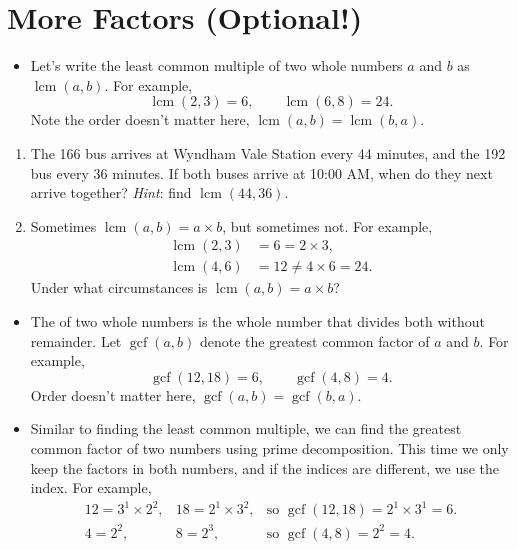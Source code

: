 \documentclass[12pt]{article}
\DeclareMathOperator{\lcm}{lcm}
\DeclareMathOperator{\gcf}{gcf}
\newcounter{exercisenum}
\newenvironment{exercises}{%
  \begin{tcolorbox}[colback=white,colframe=black,arc=0pt,breakable]
  \begin{enumerate}[label=\arabic*),leftmargin=1cm,resume=exercises]
  \setcounter{enumi}{\value{exercisenum}}
}{%
  \setcounter{exercisenum}{\value{enumi}}
  \end{enumerate}
  \end{tcolorbox}
}
\begin{document}
\thispagestyle{firstpage}

\section{More Factors (Optional!)}

\begin{itemize}
\item
Let's write the least common multiple of two whole numbers $a$ and $b$ as $\lcm(a,b)$. For example,
$$\lcm(2,3) = 6,\quad\quad \lcm(6, 8) = 24.$$
Note the order doesn't matter here, $\lcm(a,b) = \lcm(b,a)$.
\end{itemize}
\begin{exercises}
\item
The 166 bus arrives at Wyndham Vale Station every 44 minutes, and the 192 bus every 36 minutes. If both buses arrive at 10:00 AM, when do they next arrive together? \textit{Hint}: find $\lcm(44,36)$. \phantom{04:36 PM.}
\item 
Sometimes $\lcm(a,b)=a\times b$, but sometimes not. For example,
\begin{align*}
\lcm(2,3) &= 6 = 2\times 3,\\
\lcm(4,6) &= 12 \ne 4\times 6 = 24.
\end{align*}
Under what circumstances is $\lcm(a,b) = a\times b$?
\end{exercises}

\begin{itemize}
\item
The  of two whole numbers is the  whole number that divides both without remainder. Let $\gcf(a,b)$ denote the greatest common factor of $a$ and $b$. For example,
$$
\gcf(12, 18) = 6,\quad\quad \gcf(4, 8) = 4.
$$
Order doesn't matter here, $\gcf(a,b) = \gcf(b,a)$.
\item
Similar to finding the least common multiple, we can find the greatest common factor of two numbers using prime decomposition. This time we only keep the factors in both numbers, and if the indices are different, we use the  index. For example,
$$
\begin{array}{lll}
12 = 3^1\times 2^2, & 18 = 2^1\times 3^2, &\text{so } \gcf(12,18)=2^1\times 3^1 = 6. \\
4 = 2^2, & 8 = 2^3, &\text{so } \gcf(4, 8)=2^2=4.
\end{array}
$$
\end{itemize}
\end{document}
